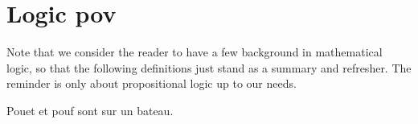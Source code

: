 \section{Logic pov}

Note that we consider the reader to have a few background in mathematical logic,
so that the following definitions just stand as a summary and refresher. The 
reminder is only about propositional logic up to our needs.

\begin{definition}
	Pouet et pouf sont sur un bateau.
\end{definition}

\begin{definition}
	
\end{definition}

\begin{definition}
	
\end{definition}